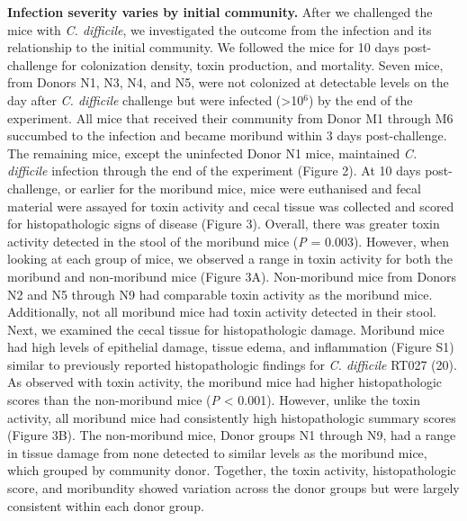 \documentclass[
  12pt,
]{article}
\begin{document}
\textbf{Infection severity varies by initial community.} After we
challenged the mice with \emph{C. difficile}, we investigated the
outcome from the infection and its relationship to the initial
community. We followed the mice for 10 days post-challenge for
colonization density, toxin production, and mortality. Seven mice, from
Donors N1, N3, N4, and N5, were not colonized at detectable levels on
the day after \emph{C. difficile} challenge but were infected
(\textgreater10\(^{6}\)) by the end of the experiment. All mice that
received their community from Donor M1 through M6 succumbed to the
infection and became moribund within 3 days post-challenge. The
remaining mice, except the uninfected Donor N1 mice, maintained \emph{C.
difficile} infection through the end of the experiment (Figure 2). At 10
days post-challenge, or earlier for the moribund mice, mice were
euthanised and fecal material were assayed for toxin activity and cecal
tissue was collected and scored for histopathologic signs of disease
(Figure 3). Overall, there was greater toxin activity detected in the
stool of the moribund mice (\emph{P} = 0.003). However, when looking at
each group of mice, we observed a range in toxin activity for both the
moribund and non-moribund mice (Figure 3A). Non-moribund mice from
Donors N2 and N5 through N9 had comparable toxin activity as the
moribund mice. Additionally, not all moribund mice had toxin activity
detected in their stool. Next, we examined the cecal tissue for
histopathologic damage. Moribund mice had high levels of epithelial
damage, tissue edema, and inflammation (Figure S1) similar to previously
reported histopathologic findings for \emph{C. difficile} RT027 (20). As
observed with toxin activity, the moribund mice had higher
histopathologic scores than the non-moribund mice (\emph{P} \textless{}
0.001). However, unlike the toxin activity, all moribund mice had
consistently high histopathologic summary scores (Figure 3B). The
non-moribund mice, Donor groups N1 through N9, had a range in tissue
damage from none detected to similar levels as the moribund mice, which
grouped by community donor. Together, the toxin activity,
histopathologic score, and moribundity showed variation across the donor
groups but were largely consistent within each donor group.
\end{document}
